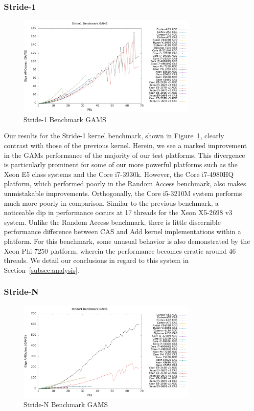 \subsubsection{Stride-1}
\label{subsubsec:stride1_res}

\begin{figure}[!t]
\centering
\includegraphics[width=3.5in]{figures/STRIDE1_GAMS.png}
\caption{Stride-1 Benchmark GAMS}
\label{fig:s1_gams}
\end{figure}

Our results for the Stride-1 kernel benchmark, shown in Figure~\ref{fig:s1_gams}, clearly contrast with those of the previous kernel.
Herein, we see a marked improvement in the GAMs performance of the majority of our test platforms.
This divergence is particularly prominent for some of our more powerful platforms such as the Xeon E5 class systems and the Core i7-3930k.
However, the Core i7-4980HQ platform, which performed poorly in the Random Access benchmark, also makes unmistakable improvements.
Orthogonally, the Core i5-3210M system performs much more poorly in comparison.
Similar to the previous benchmark, a noticeable dip in performance occurs at 17 threads for the Xeon X5-2698 v3 system.
Unlike the Random Access benchmark, there is little discernible performance difference between CAS and Add kernel implementations within a platform.
For this benchmark, some unusual behavior is also demonstrated by the Xeon Phi 7250 platform, wherein the performance becomes erratic around 46 threads.
We detail our conclusions in regard to this system in Section~\ref{subsec:analysis}.

\subsubsection{Stride-N}
\label{subsubsec:striden_res}

\begin{figure}[!t]
\centering
\includegraphics[width=3.5in]{figures/STRIDEN_GAMS.png}
\caption{Stride-N Benchmark GAMS}
\label{fig:sn_gams}
\end{figure}

